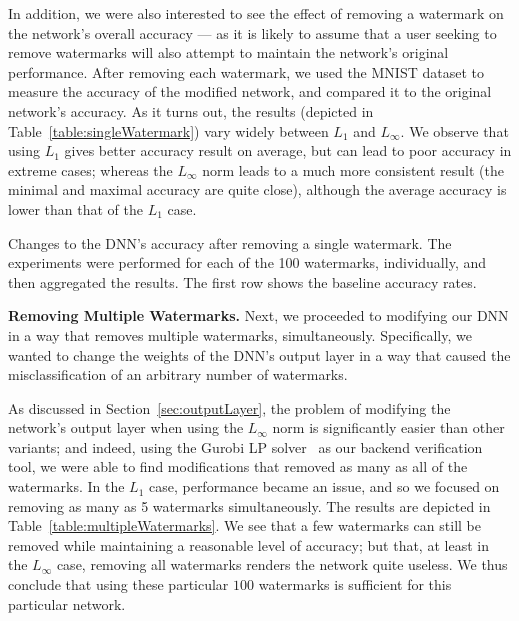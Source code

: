 \documentclass{easychair}
\begin{document}
In addition, we were also interested to see the effect of removing a
watermark on the network's overall accuracy --- as it is likely to
assume that a user seeking to remove watermarks will also attempt to
maintain the network's original performance. After removing each
watermark, we used the MNIST dataset to measure the accuracy of the
modified network, and compared it to the original network's accuracy. As it turns out, the
results (depicted in Table~\ref{table:singleWatermark})
vary widely between $L_1$ and $L_\infty$. We observe that using 
$L_1$ gives better accuracy result on average, but can lead to poor
accuracy in extreme cases; whereas the $L_\infty$ norm leads to a much
more consistent result (the minimal and maximal
accuracy are quite close), although the average accuracy is lower than
that of the $L_1$ case. 

\begin{table}
\caption{Changes to the DNN's accuracy after removing a single
  watermark. The experiments were performed for each of the
  100 watermarks, individually, and then aggregated the results. The first row
  shows the baseline accuracy rates.}
\label{table:singleWatermark}
\end{table}

\medskip\noindent \textbf{Removing Multiple Watermarks.}
Next, we proceeded to modifying our DNN in a way that
removes multiple watermarks, simultaneously. Specifically, we wanted
to change the weights of the DNN's output layer in a way that caused
the misclassification of an arbitrary number of watermarks.

As discussed in Section~\ref{sec:outputLayer}, the problem of modifying the network's
output layer when using the $L_\infty$ norm is significantly easier
than other variants; and indeed, using the Gurobi LP solver~\cite{gurobi} as our backend
verification tool, we were able to find modifications
that removed as many as all of the watermarks. In the $L_1$ case,
performance became an issue, and so we focused on removing as many as
5 watermarks simultaneously. The results are depicted in
Table~\ref{table:multipleWatermarks}. We see that a few watermarks can
still be removed while maintaining a reasonable level of accuracy; but
that, at least in the $L_\infty$ case, removing all watermarks renders
the network quite useless. We thus conclude that using these particular $100$
watermarks is sufficient for this particular network.
\end{document}
